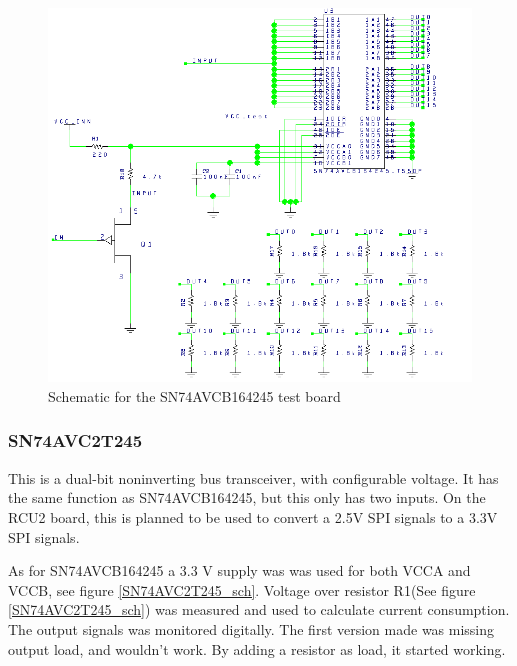 \documentclass[12pt]{article}
\numberwithin{figure}{section}
\begin{document}
\begin{figure}[!htbp]
  \centering
  \includegraphics[width=\textwidth]{SN74AVCB164245_sch.png}
  \caption{Schematic for the SN74AVCB164245 test board}
  \label{SN74AVCB164245_sch}
\end{figure}
\FloatBarrier

\subsubsection{SN74AVC2T245}
This is a dual-bit noninverting bus transceiver, with configurable voltage. It has the same function as SN74AVCB164245, but this only has two inputs.
On the RCU2 board, this is planned to be used to convert a 2.5V \acf{SPI} signals to a 3.3V \ac{SPI} signals.

As for SN74AVCB164245 a 3.3 V supply was was used for both VCCA and VCCB, see figure \ref{SN74AVC2T245_sch}. Voltage over resistor R1(See figure \ref{SN74AVC2T245_sch}) was measured and used to calculate current consumption.
The output signals was monitored digitally.
The first version made was missing output load, and wouldn't work. By adding a resistor as load, it started working.
\end{document}
